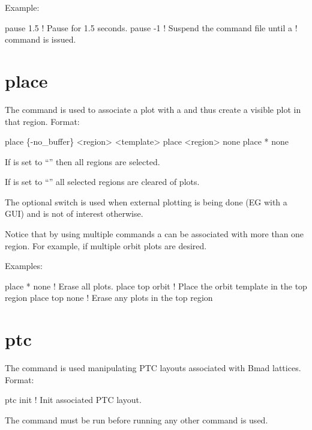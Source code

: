 Example:
\begin{example}
  pause 1.5    ! Pause for 1.5 seconds.
  pause -1     ! Suspend the command file until a  
               !   command is issued.
\end{example}

\section{place}
\label{s:place}

The  command is used to associate a  plot with a  and thus
create a visible plot in that region. Format:
\begin{example}
  place \{-no_buffer\} <region> <template>
  place <region> none
  place * none
\end{example}

\vskip 10pt 
If  is set to ``\vn{*}'' then all regions are selected.

If  is set to ``'' all selected regions are cleared of plots.

The  optional switch is used when external plotting is being done (EG with a GUI) and
is not of interest otherwise.

Notice that by using multiple  commands a  can be associated with more than
one region. For example, if multiple orbit plots are desired.

Examples:
\begin{example}
  place * none     ! Erase all plots.
  place top orbit  ! Place the orbit template in the top region
  place top none   ! Erase any plots in the top region
\end{example}

\section{ptc}
\label{s:ptc}

The  command is used manipulating PTC layouts associated with Bmad
lattices. Format:
\begin{example}
  ptc init            ! Init associated PTC layout.
\end{example}

\vskip 10pt 
The  command must be run before running any other  command is used.

